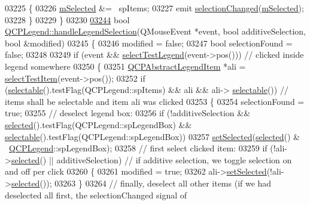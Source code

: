 \begin{DoxyCode}
03225   \{
03226     \hyperlink{a00045_a735cbf24a0cd72b712bb01dfa7d909b2}{mSelected} &= ~spItems;
03227     emit \hyperlink{a00045_a286149b644d5f5c884a0140219d979f6}{selectionChanged}(\hyperlink{a00045_a735cbf24a0cd72b712bb01dfa7d909b2}{mSelected});
03228   \}
03229 \}
03230 
\hypertarget{a00115_source_l03244}{}\hyperlink{a00045_a44cdc6af6cd6e62a2bd827c3236c7261}{03244} \textcolor{keywordtype}{bool} \hyperlink{a00045_a44cdc6af6cd6e62a2bd827c3236c7261}{QCPLegend::handleLegendSelection}(QMouseEvent *event, \textcolor{keywordtype}{bool} 
      additiveSelection, \textcolor{keywordtype}{bool} &modified)
03245 \{
03246   modified = \textcolor{keyword}{false};
03247   \textcolor{keywordtype}{bool} selectionFound = \textcolor{keyword}{false};
03248   
03249   \textcolor{keywordflow}{if} (event && \hyperlink{a00045_a6388446e0906b21ebf3a92310570e73e}{selectTestLegend}(event->pos())) \textcolor{comment}{// clicked inside legend somewhere}
03250   \{
03251     \hyperlink{a00023}{QCPAbstractLegendItem} *ali = \hyperlink{a00045_a8bbb0b003cc93f07dff1d69416b606f0}{selectTestItem}(event->pos());
03252     \textcolor{keywordflow}{if} (\hyperlink{a00045_a459f39581d1eba9ee80557837601e21c}{selectable}().testFlag(QCPLegend::spItems) && ali && ali->
      \hyperlink{a00023_a0a0205f33f37edae50826c24cb8f1983}{selectable}()) \textcolor{comment}{// items shall be selectable and item ali was clicked }
03253     \{
03254       selectionFound = \textcolor{keyword}{true};
03255       \textcolor{comment}{// deselect legend box:}
03256       \textcolor{keywordflow}{if} (!additiveSelection && \hyperlink{a00045_a10948e896935ad14f374e6f712afaae9}{selected}().testFlag(QCPLegend::spLegendBox) && 
      \hyperlink{a00045_a459f39581d1eba9ee80557837601e21c}{selectable}().testFlag(QCPLegend::spLegendBox))
03257         \hyperlink{a00045_a752c48b30f8ba870b55e79659385f107}{setSelected}(\hyperlink{a00045_a10948e896935ad14f374e6f712afaae9}{selected}() & ~\hyperlink{a00045}{QCPLegend}::spLegendBox);
03258       \textcolor{comment}{// first select clicked item:}
03259       \textcolor{keywordflow}{if} (!ali->\hyperlink{a00023_ac776e68e3367704452131c6aa9908bb9}{selected}() || additiveSelection) \textcolor{comment}{// if additive selection, we toggle selection on
       and off per click}
03260       \{
03261         modified = \textcolor{keyword}{true};
03262         ali->\hyperlink{a00023_a6eed93b0ab99cb3eabb043fb08179c2b}{setSelected}(!ali->\hyperlink{a00023_ac776e68e3367704452131c6aa9908bb9}{selected}());
03263       \}
03264       \textcolor{comment}{// finally, deselect all other items (if we had deselected all first, the selectionChanged signal of
}
\end{DoxyCode}
